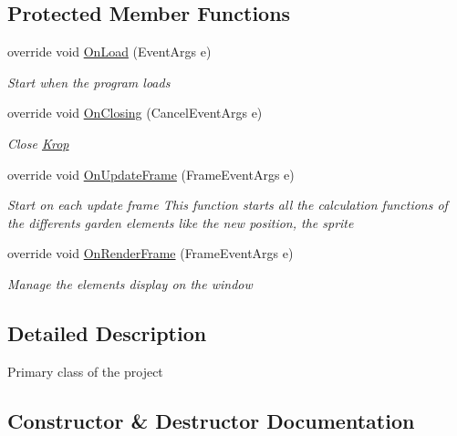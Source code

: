 \subsection*{Protected Member Functions}
\begin{DoxyCompactItemize}
\item 
override void \mbox{\hyperlink{class_krop_1_1_krohonde_1_1_game_a1d0295e8614a48b8a81552b209c5ed4a}{On\+Load}} (Event\+Args e)
\begin{DoxyCompactList}\small\item\em Start when the program loads \end{DoxyCompactList}\item 
override void \mbox{\hyperlink{class_krop_1_1_krohonde_1_1_game_ae417ed79f31ff0280ca92ec3202990e3}{On\+Closing}} (Cancel\+Event\+Args e)
\begin{DoxyCompactList}\small\item\em Close \mbox{\hyperlink{namespace_krop}{Krop}} \end{DoxyCompactList}\item 
override void \mbox{\hyperlink{class_krop_1_1_krohonde_1_1_game_ad88326ce1906f9e45caa3005781a70a2}{On\+Update\+Frame}} (Frame\+Event\+Args e)
\begin{DoxyCompactList}\small\item\em Start on each update frame This function starts all the calculation functions of the differents garden elements like the new position, the sprite \end{DoxyCompactList}\item 
override void \mbox{\hyperlink{class_krop_1_1_krohonde_1_1_game_ab12bfce981cec214fe7f8e35abd342eb}{On\+Render\+Frame}} (Frame\+Event\+Args e)
\begin{DoxyCompactList}\small\item\em Manage the elements display on the window \end{DoxyCompactList}\end{DoxyCompactItemize}


\subsection{Detailed Description}
Primary class of the project 



\subsection{Constructor \& Destructor Documentation}
\mbox{\label{class_krop_1_1_krohonde_1_1_game_a99b4f31e791c00af369068b6a17482de}} 

